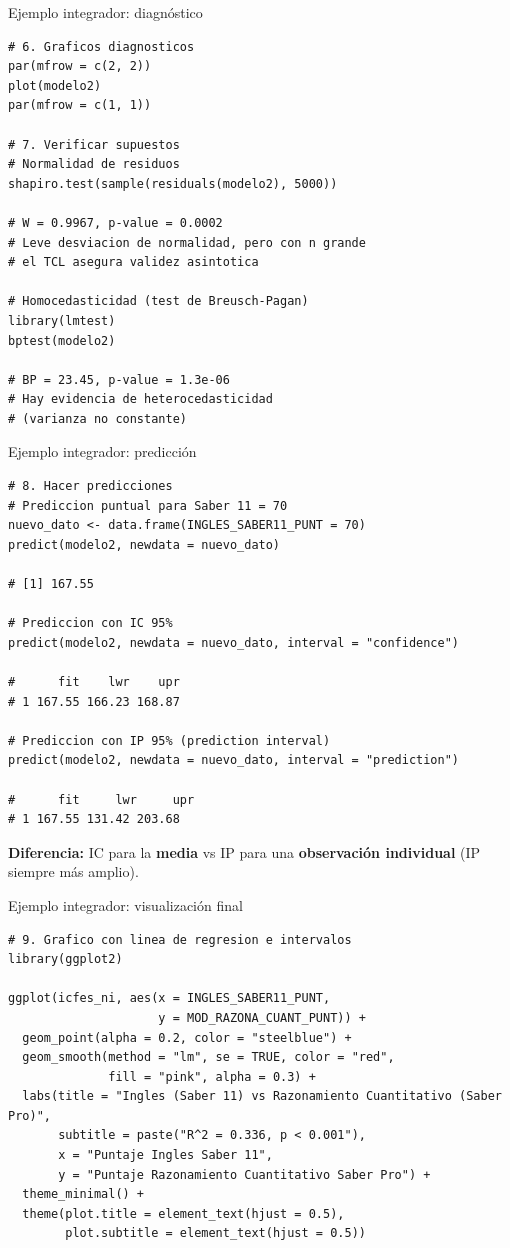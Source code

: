 \documentclass[aspectratio=169, 11pt]{beamer}
\begin{document}
\begin{frame}[fragile]{Ejemplo integrador: diagn\'ostico}
\begin{lstlisting}[basicstyle=\ttfamily\scriptsize]
# 6. Graficos diagnosticos
par(mfrow = c(2, 2))
plot(modelo2)
par(mfrow = c(1, 1))

# 7. Verificar supuestos
# Normalidad de residuos
shapiro.test(sample(residuals(modelo2), 5000))

# W = 0.9967, p-value = 0.0002
# Leve desviacion de normalidad, pero con n grande
# el TCL asegura validez asintotica

# Homocedasticidad (test de Breusch-Pagan)
library(lmtest)
bptest(modelo2)

# BP = 23.45, p-value = 1.3e-06
# Hay evidencia de heterocedasticidad
# (varianza no constante)
\end{lstlisting}
\end{frame}

\begin{frame}[fragile]{Ejemplo integrador: predicci\'on}
\begin{lstlisting}[basicstyle=\ttfamily\scriptsize]
# 8. Hacer predicciones
# Prediccion puntual para Saber 11 = 70
nuevo_dato <- data.frame(INGLES_SABER11_PUNT = 70)
predict(modelo2, newdata = nuevo_dato)

# [1] 167.55

# Prediccion con IC 95%
predict(modelo2, newdata = nuevo_dato, interval = "confidence")

#      fit    lwr    upr
# 1 167.55 166.23 168.87

# Prediccion con IP 95% (prediction interval)
predict(modelo2, newdata = nuevo_dato, interval = "prediction")

#      fit     lwr     upr
# 1 167.55 131.42 203.68
\end{lstlisting}

\textbf{Diferencia:} IC para la \textbf{media} vs IP para una \textbf{observación individual} (IP siempre más amplio).
\end{frame}

\begin{frame}[fragile]{Ejemplo integrador: visualización final}
\begin{lstlisting}
# 9. Grafico con linea de regresion e intervalos
library(ggplot2)

ggplot(icfes_ni, aes(x = INGLES_SABER11_PUNT,
                     y = MOD_RAZONA_CUANT_PUNT)) +
  geom_point(alpha = 0.2, color = "steelblue") +
  geom_smooth(method = "lm", se = TRUE, color = "red",
              fill = "pink", alpha = 0.3) +
  labs(title = "Ingles (Saber 11) vs Razonamiento Cuantitativo (Saber Pro)",
       subtitle = paste("R^2 = 0.336, p < 0.001"),
       x = "Puntaje Ingles Saber 11",
       y = "Puntaje Razonamiento Cuantitativo Saber Pro") +
  theme_minimal() +
  theme(plot.title = element_text(hjust = 0.5),
        plot.subtitle = element_text(hjust = 0.5))
\end{lstlisting}
\end{frame}
\end{document}
